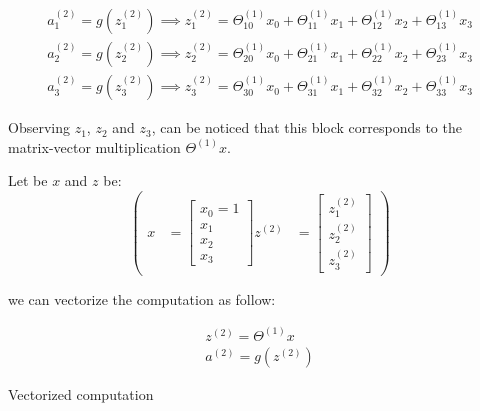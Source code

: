\begin{equation}\label{eq:feeddefinitions}
\begin{aligned}
a_1^{(2)}  = g(z_1^{(2)}) \implies z_1^{(2)} = \Theta_{10}^{(1)}x_0 + \Theta_{11}^{(1)}x_1 +  \Theta_{12}^{(1)}x_2 + \Theta_{13}^{(1)}x_3 \\
a_2^{(2)}  = g(z_2^{(2)}) \implies z_2^{(2)} = \Theta_{20}^{(1)}x_0 + \Theta_{21}^{(1)}x_1 +  \Theta_{22}^{(1)}x_2 + \Theta_{23}^{(1)}x_3 \\
a_3^{(2)} = g(z_3^{(2)}) \implies  z_3^{(2)} = \Theta_{30}^{(1)}x_0 + \Theta_{31}^{(1)}x_1 +  \Theta_{32}^{(1)}x_2 + \Theta_{33}^{(1)}x_3 
\end{aligned}
\end{equation}

Observing $z_1$, $z_2$ and $z_3$, can be noticed that this block corresponds to the matrix-vector multiplication $\Theta^{(1)}x$.

Let be $x$ and $z$ be:
\begin{equation}
\begin{pmatrix}
   x &= \begin{bmatrix}
           x_{0}  = 1\\
           x_{1} \\
           x_{2} \\
	     x_{3} 
         \end{bmatrix}

z^{(2)} &= \begin{bmatrix}

           z_{1}^{(2)} \\
           z_{2}^{(2)} \\
	    z_{3}^{(2)} 
         \end{bmatrix}
\end{pmatrix}
\end{equation}

we can vectorize the computation as follow:


\begin{eqfloat}[H]
\begin{equation}
\begin{aligned}
	z^{(2)} = \Theta^{(1)}x\\
	a^{(2)}  = g(z^{(2)}) 
\end{aligned}	
\end{equation}
      \addtocounter{equation}{-1}
        \caption{ Vectorized computation}
        \label{eq:compvector}
    \end{eqfloat}



